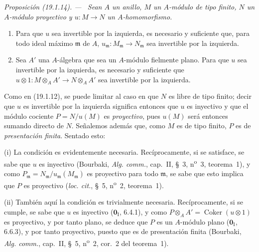 \documentclass[10pt,oneside]{book}
\makeatletter
\newcommand{\setmanualcurrentlabel}[1]{\def\@currentlabel{#1}}
\newcommand{\oldpage}[2][]{%
  \setcounter{footnote}{0}%
  \marginpar{\scriptsize\textbf{#1}~|~#2}\ignorespaces}
\newenvironment{proposition}[1][]{%
  \setmanualcurrentlabel{#1}\par\medskip\noindent\itshape Proposición (#1). ---\ }{\par}
\makeatother
\begin{document}
\begin{proposition}[19.1.14]
\label{0.19.1.14-es}
Sean $A$ un anillo, $M$ un $A$-módulo de tipo finito, $N$ un $A$-módulo
proyectivo y $u:M\to N$ un $A$-homomorfismo.
\begin{enumerate}
  \item[\textup{(i)}] Para que $u$ sea invertible por la izquierda, es necesario y
  suficiente que, para todo ideal máximo $\mathfrak m$ de $A$,
  $u_{\mathfrak m}:M_{\mathfrak m}\to N_{\mathfrak m}$ sea invertible por la
  izquierda.
  \item[\textup{(ii)}] Sea $A'$ una $A$-álgebra que sea un $A$-módulo fielmente plano.
  Para que $u$ sea invertible por la izquierda, es necesario y suficiente que
  $u\otimes1:M\otimes_AA'\to N\otimes_AA'$ sea invertible por la izquierda.
\end{enumerate}
\end{proposition}

Como en (19.1.12), se puede limitar al caso en que $N$ es libre de tipo finito;
decir que $u$ es invertible por la izquierda significa entonces que $u$ es
inyectivo y que el módulo cociente $P=N/u(M)$ es \emph{proyectivo}, pues
$u(M)$ será entonces sumando directo de $N$. Señalemos además que, como $M$ es
de tipo finito, $P$ es de \emph{presentación finita}. Sentado esto:

(i) La condición es evidentemente necesaria. Recíprocamente, si se satisface,
se sabe que $u$ es inyectivo (Bourbaki, \emph{Alg. comm.}, cap.~II, §~3,
n\textsuperscript{o}~3, teorema~1), y como
$P_{\mathfrak m}=N_{\mathfrak m}/u_{\mathfrak m}(M_{\mathfrak m})$ es
proyectivo para todo $\mathfrak m$, se sabe que esto implica que $P$ es
proyectivo (\emph{loc. cit.}, §~5, n\textsuperscript{o}~2, teorema~1).

(ii) También aquí la condición es trivialmente necesaria. Recíprocamente, si
se cumple, se sabe que $u$ es inyectivo ($\mathbf{0}_{\mathrm I}$, 6.4.1), y
como $P\otimes_AA'=\operatorname{Coker}(u\otimes1)$ es proyectivo, y por tanto
plano, se deduce que $P$ es un $A$-módulo plano
($\mathbf{0}_{\mathrm I}$, 6.6.3), y por tanto proyectivo, puesto que es de
presentación finita (Bourbaki, \emph{Alg. comm.}, cap.~II, §~5,
n\textsuperscript{o}~2, cor.~2 del teorema~1).

\oldpage[0\textsubscript{IV-1}]{78}
\end{document}
